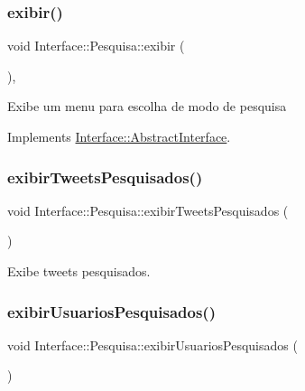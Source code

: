 \subsubsection{\texorpdfstring{exibir()}{exibir()}}
{\footnotesize\ttfamily void Interface\+::\+Pesquisa\+::exibir (\begin{DoxyParamCaption}{ }\end{DoxyParamCaption})\hspace{0.3cm}{\ttfamily [override]}, {\ttfamily [virtual]}}

Exibe um menu para escolha de modo de pesquisa 

Implements \hyperlink{class_interface_1_1_abstract_interface_af1a45726ea636cdbf1cf2d7daa5708be}{Interface\+::\+Abstract\+Interface}.

\mbox{\label{class_interface_1_1_pesquisa_ad8f5f3dbb0409a4d331f23f4bcebccb4}} 
\subsubsection{\texorpdfstring{exibir\+Tweets\+Pesquisados()}{exibirTweetsPesquisados()}}
{\footnotesize\ttfamily void Interface\+::\+Pesquisa\+::exibir\+Tweets\+Pesquisados (\begin{DoxyParamCaption}{ }\end{DoxyParamCaption})\hspace{0.3cm}{\ttfamily [private]}}



Exibe tweets pesquisados. 

\mbox{\label{class_interface_1_1_pesquisa_a489f4605a56f01a61e9d93c7f5d34b14}} 
\subsubsection{\texorpdfstring{exibir\+Usuarios\+Pesquisados()}{exibirUsuariosPesquisados()}}
{\footnotesize\ttfamily void Interface\+::\+Pesquisa\+::exibir\+Usuarios\+Pesquisados (\begin{DoxyParamCaption}{ }\end{DoxyParamCaption})\hspace{0.3cm}{\ttfamily [private]}}



